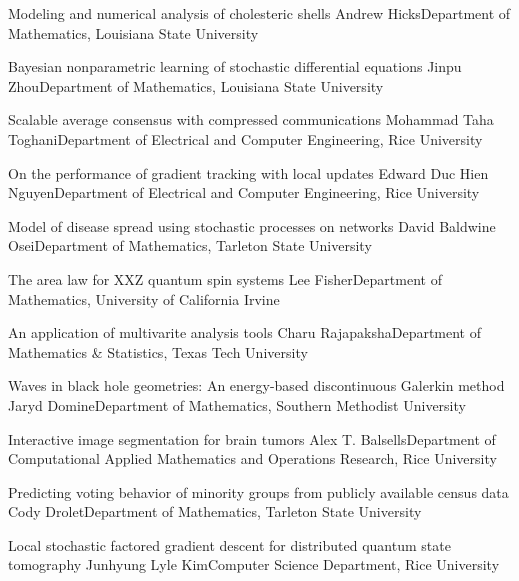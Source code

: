 \begin{postersPG}
\item\poster %
{Modeling and numerical analysis of cholesteric shells}
{Andrew Hicks}{Department of Mathematics, Louisiana State University}

\item\poster %
{Bayesian nonparametric learning of stochastic differential equations}
{Jinpu Zhou}{Department of Mathematics, Louisiana State University}

\item\poster %
{Scalable average consensus with compressed communications}
{Mohammad Taha Toghani}{Department of Electrical and Computer Engineering, Rice University}

\item\poster %
{On the performance of gradient tracking with local updates}
{Edward Duc Hien Nguyen}{Department of Electrical and Computer Engineering, Rice University}

\item\poster %
{Model of disease spread using stochastic processes on networks}
{David Baldwine Osei}{Department of Mathematics, Tarleton State University}

\item\poster %
{The area law for XXZ quantum spin systems}
{Lee Fisher}{Department of Mathematics, University of California Irvine}

\item\poster %
{An application of multivarite analysis tools}
{Charu Rajapaksha}{Department of Mathematics \& Statistics, Texas Tech University}

\item\poster %
{Waves in black hole geometries: An energy-based discontinuous Galerkin method}
{Jaryd Domine}{Department of Mathematics, Southern Methodist University}

\item\poster %
{Interactive image segmentation for brain tumors}
{Alex T. Balsells}{Department of Computational Applied Mathematics and Operations Research, Rice University}

\item\poster %
{Predicting voting behavior of minority groups from publicly available census data}
{Cody Drolet}{Department of Mathematics, Tarleton State University}

\item\poster %
{Local stochastic factored gradient descent for distributed quantum state tomography}
{Junhyung Lyle Kim}{Computer Science Department, Rice University}


\end{postersPG}
